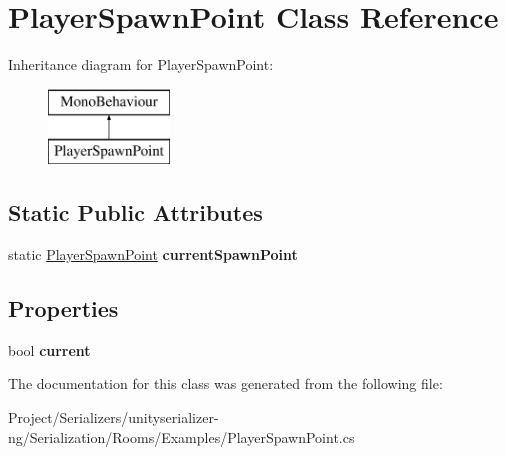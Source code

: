 \hypertarget{class_player_spawn_point}{}\section{Player\+Spawn\+Point Class Reference}
\label{class_player_spawn_point}
Inheritance diagram for Player\+Spawn\+Point\+:\begin{figure}[H]
\begin{center}
\leavevmode
\includegraphics[height=2.000000cm]{class_player_spawn_point}
\end{center}
\end{figure}
\subsection*{Static Public Attributes}
\begin{DoxyCompactItemize}
\item 
\mbox{\label{class_player_spawn_point_acb5190cac21b1663f0cd6e2c18ec379d}} 
static \hyperlink{class_player_spawn_point}{Player\+Spawn\+Point} {\bfseries current\+Spawn\+Point}
\end{DoxyCompactItemize}
\subsection*{Properties}
\begin{DoxyCompactItemize}
\item 
\mbox{\label{class_player_spawn_point_ae5c1307f57aef3291b3190541bb0c0cf}} 
bool {\bfseries current}
\end{DoxyCompactItemize}


The documentation for this class was generated from the following file\+:\begin{DoxyCompactItemize}
\item 
Project/\+Serializers/unityserializer-\/ng/\+Serialization/\+Rooms/\+Examples/Player\+Spawn\+Point.\+cs\end{DoxyCompactItemize}
